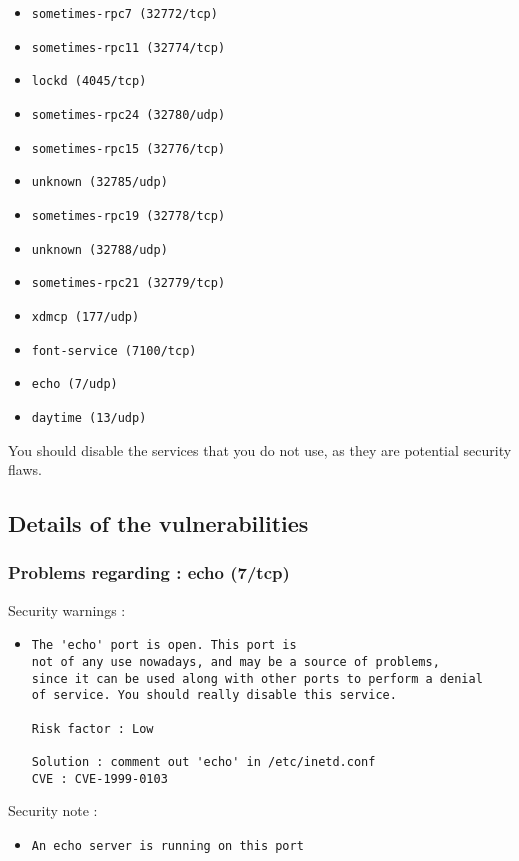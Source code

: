 \documentclass{article}
\begin{document}
\begin{itemize}
\item\verb+sometimes-rpc7 (32772/tcp)+
\item\verb+sometimes-rpc11 (32774/tcp)+
\item\verb+lockd (4045/tcp)+
\item\verb+sometimes-rpc24 (32780/udp)+
\item\verb+sometimes-rpc15 (32776/tcp)+
\item\verb+unknown (32785/udp)+
\item\verb+sometimes-rpc19 (32778/tcp)+
\item\verb+unknown (32788/udp)+
\item\verb+sometimes-rpc21 (32779/tcp)+
\item\verb+xdmcp (177/udp)+
\item\verb+font-service (7100/tcp)+
\item\verb+echo (7/udp)+
\item\verb+daytime (13/udp)+
\end{itemize}
You should disable the services that you do not use, as they are potential security flaws.
\subsection{Details of the vulnerabilities}
\subsubsection{Problems regarding : echo (7/tcp)}
Security warnings :\\
\begin{itemize}
\item \begin{verbatim}
The 'echo' port is open. This port is
not of any use nowadays, and may be a source of problems, 
since it can be used along with other ports to perform a denial
of service. You should really disable this service.

Risk factor : Low

Solution : comment out 'echo' in /etc/inetd.conf
CVE : CVE-1999-0103
\end{verbatim}\end{itemize}
Security note :\\
\begin{itemize}
\item \begin{verbatim}
An echo server is running on this port
\end{verbatim}\end{itemize}
\end{document}
